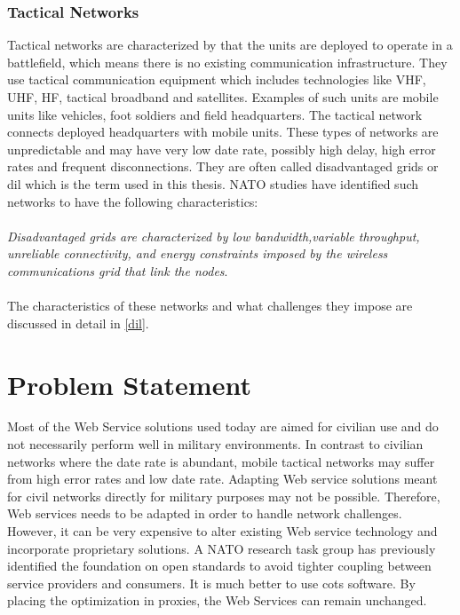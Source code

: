 \documentclass[USenglish]{ifimaster}
\begin{document}
\subsubsection{Tactical Networks}
Tactical networks are characterized by that the units are deployed to operate in
a battlefield, which means there is no existing communication infrastructure.
They use tactical communication equipment which includes technologies like VHF,
UHF, HF, tactical broadband and satellites\cite{IST-090}. %
Examples of such units are mobile units like vehicles, foot soldiers and field
headquarters. The tactical network connects deployed headquarters with mobile
units. These types of networks are unpredictable and may have very low date
rate, possibly high delay, high error rates and frequent disconnections. They
are often called disadvantaged grids or \gls{dil} which is the term used in this
thesis. NATO studies have identified such networks to have the following
characteristics:
\\\\
\textit{
Disadvantaged grids are characterized by low bandwidth,variable throughput,
unreliable connectivity, and energy constraints imposed by the wireless
communications grid that link the nodes}\cite{nato-disadvantaged-grids}.
\paragraph{}
The characteristics of these networks and what challenges they impose are
discussed in detail in \cref{dil}.

\section{Problem Statement}
Most of the Web Service solutions used today are aimed for civilian use and do
not necessarily perform well in military environments. In contrast to civilian
networks where the date rate is abundant, mobile tactical networks may suffer
from high error rates and low date rate. Adapting Web service solutions meant
for civil networks directly for military purposes may not be possible.
Therefore, Web services needs to be adapted in order to handle network
challenges. However, it can be very expensive to alter existing Web service
technology and incorporate proprietary solutions. A NATO research task group has
previously identified the foundation on open standards to avoid tighter coupling
between service providers and consumers\cite{IST-090}. It is much better to use
\gls{cots} software. By placing the optimization in proxies, the
Web Services can remain unchanged.
\end{document}
